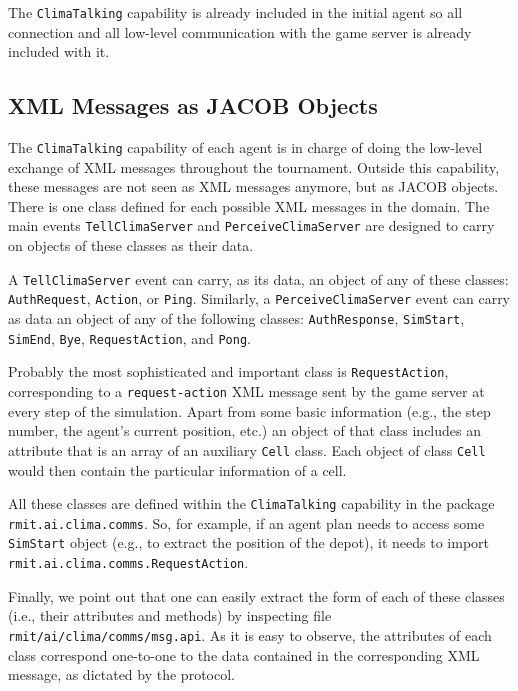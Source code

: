 \documentclass[10pt]{article}
\begin{document}
The \texttt{ClimaTalking} capability is already included in the initial agent
so all connection and all low-level communication with the game server is
already included with it.


\subsection{XML Messages as JACOB Objects}

The \texttt{ClimaTalking} capability of each agent is in charge of doing the
low-level exchange of XML messages throughout the tournament. Outside this
capability, these messages are not seen as XML messages anymore, but as JACOB
objects.
%
There is one class defined for each possible XML messages in the domain.
The main events \texttt{TellClimaServer} and \texttt{PerceiveClimaServer} are
designed to carry on objects of these classes as their data.

A \texttt{TellClimaServer} event can carry, as its data, an object of any of
these classes: \texttt{AuthRequest}, \texttt{Action}, or \texttt{Ping}. 
%
Similarly, a \texttt{PerceiveClimaServer} event can carry as data an object of
any of the following classes: \texttt{AuthResponse}, \texttt{SimStart},
\texttt{SimEnd}, \texttt{Bye}, \texttt{RequestAction}, and \texttt{Pong}.

Probably the most sophisticated and important class is
\texttt{RequestAction}, corresponding to a \texttt{request-action} XML
message sent by the game server at every step of the simulation. Apart from
some basic information (e.g., the step number, the agent's current position,
etc.) an object of that class includes an attribute that is an array of an
auxiliary \texttt{Cell} class. Each object of class \texttt{Cell} would then
contain the particular information of a cell.

All these classes are defined within the \texttt{ClimaTalking} capability in
the package \texttt{rmit.ai.clima.comms}. So, for example, if an agent plan
needs to access some \texttt{SimStart} object (e.g., to extract the position of
the depot), it needs to import \texttt{rmit.ai.clima.comms.RequestAction}.

Finally, we point out that one can easily extract the form of each of these
classes (i.e., their attributes and methods) by inspecting file
\texttt{rmit/ai/clima/comms/msg.api}. As it is easy to observe, the attributes
of each class correspond one-to-one to the data contained in the corresponding
XML message, as dictated by the protocol.
\end{document}
